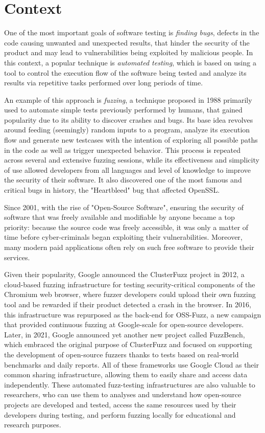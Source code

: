 \section{Context}
One of the most important goals of software testing is \textit{finding bugs}, defects in the code causing unwanted and unexpected results, that hinder the security of the product and may lead to vulnerabilities being exploited by malicious people.  In this context, a popular technique is \textit{automated testing}, which is based on using a tool to control the execution flow of the software being tested and analyze its results via repetitive tasks performed over long periods of time. 

An example of this approach is \textit{fuzzing}, a technique proposed in 1988 primarily used to automate simple tests previously performed by humans, that gained popularity due to its ability to discover crashes and bugs. Its base idea revolves around feeding (seemingly) random inputs to a program, analyze its execution flow and generate new testcases with the intention of exploring all possible paths in the code as well as trigger unexpected behavior. This process is repeated across several and extensive fuzzing sessions, while its effectiveness and simplicity of use allowed developers from all languages and level of knowledge to improve the security of their software. It also discovered one of the most famous and critical bugs in history, the "Heartbleed" bug that affected OpenSSL.

Since 2001, with the rise of "Open-Source Software", ensuring the security of software that was freely available and modifiable by anyone became a top priority: because the source code was freely accessible, it was only a matter of time before cyber-criminals began exploiting their vulnerabilities. Moreover, many modern paid applications often rely on such free software to provide their services. 

Given their popularity, Google announced the ClusterFuzz project in 2012, a cloud-based fuzzing infrastructure for testing security-critical components of the Chromium web browser, where fuzzer developers could upload their own fuzzing tool and be rewarded if their product detected a crash in the browser. In 2016, this infrastructure was repurposed as the back-end for OSS-Fuzz, a new campaign that provided continuous fuzzing at Google-scale for open-source developers. Later, in 2021, Google announced yet another new project called FuzzBench, which embraced the original purpose of ClusterFuzz and focused on supporting the development of open-source fuzzers thanks to tests based on real-world benchmarks and daily reports. All of these frameworks use Google Cloud as their common sharing infrastructure, allowing them to easily share and access data independently. These automated fuzz-testing infrastructures are also valuable to researchers, who can use them to analyses and understand how open-source projects are developed and tested, access the same resources used by their developers during testing, and perform fuzzing locally for educational and research purposes.

